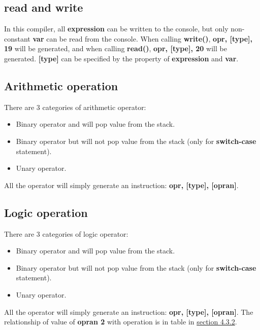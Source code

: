\documentclass{article}
\begin{document}
		\subsection{read and write}
		In this compiler, all \textbf{expression} can be written to the console, but only non-constant \textbf{var} can be read from the console. When calling \textbf{write()}, \textbf{opr, [type], 19} will be generated, and when calling \textbf{read()}, \textbf{opr, [type], 20} will be generated. \textbf{[type]} can be specified by the property of \textbf{expression} and \textbf{var}.
		\subsection{Arithmetic operation}
		There are 3 categories of arithmetic operator:
		\begin{itemize}
		\item Binary operator and will pop value from the stack.
		\item Binary operator but will not pop value from the stack (only for \textbf{switch-case} statement).
		\item Unary operator.
		\end{itemize}
		All the operator will simply generate an instruction: \textbf{opr, [type], [opran]}.
		\subsection{Logic operation}
		There are 3 categories of logic operator:
		\begin{itemize}
		\item Binary operator and will pop value from the stack.
		\item Binary operator but will not pop value from the stack (only for \textbf{switch-case} statement).
		\item Unary operator.
		\end{itemize}
		All the operator will simply generate an instruction: \textbf{opr, [type], [opran]}. The relationship of value of \textbf{opran 2} with operation is in table in \hyperlink{4.3.2}{section 4.3.2}.
\end{document}
